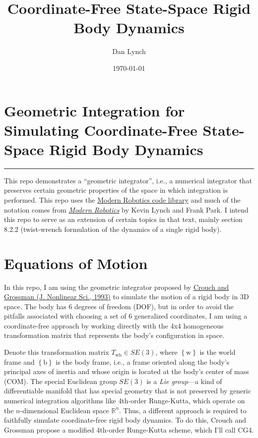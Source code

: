 \documentclass[]{article}
\title{Coordinate-Free State-Space Rigid Body Dynamics}
\author{Dan Lynch}
\date{\today}
\newcommand{\colvec}[1]{\mathbf{#1}}
\theoremstyle{definition}
\theoremstyle{remark}
\newcommand{\ie}{i.e., }
\begin{document}


\section*{Geometric Integration for Simulating Coordinate-Free State-Space Rigid Body Dynamics}
\noindent\hrule
\medskip
This repo demonstrates a ``geometric integrator'', \ie a numerical integrator that preserves certain geometric properties of the space in which integration is performed.
This repo uses the \href{https://github.com/NxRLab/ModernRobotics}{Modern Robotics code library} and much of the notation comes from \href{https://hades.mech.northwestern.edu/index.php/Modern_Robotics}{\textit{Modern Robotics}} by Kevin Lynch and Frank Park.
I intend this repo to serve as an extension of certain topics in that text, mainly section 8.2.2 (twist-wrench formulation of the dynamics of a single rigid body).

\section{Equations of Motion}
In this repo, I am using the geometric integrator proposed by \href{https://doi.org/10.1007/BF02429858}{Crouch and Grossman (J. Nonlinear Sci., 1993)} to simulate the motion of a rigid body in 3D space.
The body has 6 degrees of freedom (DOF), but in order to avoid the pitfalls associated with choosing a set of 6 generalized coordinates, I am using a coordinate-free approach by working directly with the 4x4 homogeneous transformation matrix that represents the body's configuration in space.

Denote this transformation matrix $T_\mathrm{wb}\in SE(3)$, where $\left\{\mathrm{w}\right\}$ is the world frame and $\left\{\mathrm{b}\right\}$ is the body frame, i.e., a frame oriented along the body's principal axes of inertia and whose origin is located at the body's center of mass (COM).
The special Euclidean group $SE(3)$ is a \textit{Lie group}---a kind of differentiable manifold that has special geometry that is not preserved by generic numerical integration algorithms like 4th-order Runge-Kutta, which operate on the $n$-dimensional Euclidean space $\mathbb{R}^n$.
Thus, a different approach is required to faithfully simulate coordinate-free rigid body dynamics. To do this, Crouch and Grossman propose a modified 4th-order Runge-Kutta scheme, which I'll call CG4.
\end{document}
